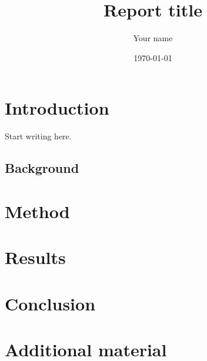 \documentclass[11pt]{report}
\title{Report title}
\author{Your name}
\date{\today}
\begin{document}
\maketitle
\tableofcontents

\chapter{Introduction}
\label{ch:introduction}

Start writing here.

\section{Background}

\chapter{Method}
\label{ch:method}

\chapter{Results}

\chapter{Conclusion}

\appendix
\chapter{Additional material}
\end{document}
